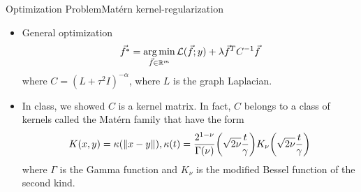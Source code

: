 	\begin{frame}{Optimization Problem}{Matérn kernel-regularization}
		\begin{itemize}
			\item General optimization
			\[\vec{f^*} = \operatorname*{arg\,min}_{\vec{f} \in \mathbb{R}^{m}} \mathcal{L}(\vec{f};y) + \lambda \vec{f}^{T}C^{-1}\vec{f}\]
			where $C = (L + \tau^2 I)^{-\alpha}$, where $L$ is the graph Laplacian.
			\item In class, we showed $C$ is a kernel matrix. In fact, $C$ belongs to a class of kernels called the Matérn family that have the form
			\[
				K(x,y) = \kappa({\left\|x-y\right\|}), \kappa(t) = \frac{2^{1-\nu}}{\Gamma(\nu)}{\left(\sqrt{2\nu}\frac{t}{\gamma}\right)}K_{\nu}{\left(\sqrt{2\nu}\frac{t}{\gamma}\right)}	
			\]
			where $\Gamma$ is the Gamma function and $K_\nu$ is the modified Bessel function of the second kind.
		\end{itemize}
	\end{frame}